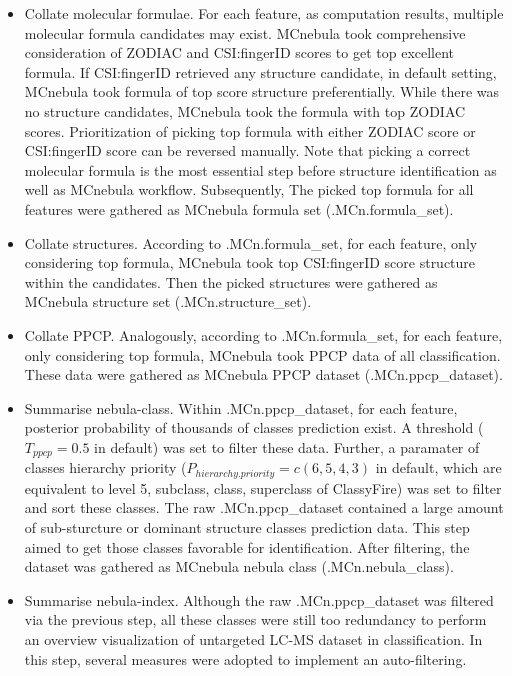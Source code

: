 \begin{itemize}
\item
  Collate molecular formulae. For each feature, as computation results,
  multiple molecular formula candidates may exist. MCnebula took
  comprehensive consideration of ZODIAC and CSI:fingerID scores to get
  top excellent formula. If CSI:fingerID retrieved any structure
  candidate, in default setting, MCnebula took formula of top score
  structure preferentially. While there was no structure candidates,
  MCnebula took the formula with top ZODIAC scores. Prioritization of
  picking top formula with either ZODIAC score or CSI:fingerID score can
  be reversed manually. Note that picking a correct molecular formula is
  the most essential step before structure identification as well as
  MCnebula workflow. Subsequently, The picked top formula for all
  features were gathered as MCnebula formula set (.MCn.formula\_set).
\item
  Collate structures. According to .MCn.formula\_set, for each feature,
  only considering top formula, MCnebula took top CSI:fingerID score
  structure within the candidates. Then the picked structures were
  gathered as MCnebula structure set (.MCn.structure\_set).
\item
  Collate PPCP. Analogously, according to .MCn.formula\_set, for each
  feature, only considering top formula, MCnebula took PPCP data of all
  classification. These data were gathered as MCnebula PPCP dataset
  (.MCn.ppcp\_dataset).
\item
  Summarise nebula-class. Within .MCn.ppcp\_dataset, for each feature,
  posterior probability of thousands of classes prediction exist. A
  threshold (\(T_{ppcp} = 0.5\) in default) was set to filter these
  data. Further, a paramater of classes hierarchy priority
  (\(P_{hierarchy.priority} = c(6, 5, 4, 3)\) in default, which are
  equivalent to level 5, subclass, class, superclass of ClassyFire) was
  set to filter and sort these classes. The raw .MCn.ppcp\_dataset
  contained a large amount of sub-sturcture or dominant structure
  classes prediction data. This step aimed to get those classes
  favorable for identification. After filtering, the dataset was
  gathered as MCnebula nebula class (.MCn.nebula\_class).
\item
  Summarise nebula-index. Although the raw .MCn.ppcp\_dataset was
  filtered via the previous step, all these classes were still too
  redundancy to perform an overview visualization of untargeted LC-MS
  dataset in classification. In this step, several measures were adopted
  to implement an auto-filtering.


\end{itemize}
